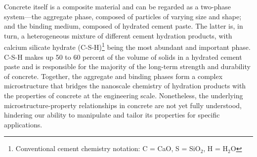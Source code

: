 Concrete itself is a composite material and can be regarded as a two-phase system\supercite{mehta2014concrete}---the aggregate phase, composed of particles of varying size and shape; and the binding medium, composed of hydrated cement paste. The latter is, in turn, a heterogeneous mixture of different cement hydration products, with calcium silicate hydrate (C-S-H)\footnote{
Conventional cement chemistry notation: C = CaO, S = SiO$_2$, H = H$_2$O
} being the most abundant and important phase. C-S-H makes up 50 to 60 percent of the volume of solids in a hydrated cement paste and is responsible for the majority of the long-term strength and durability of concrete\supercite{mehta2014concrete}. Together, the aggregate and binding phases form a complex microstructure that bridges the nanoscale chemistry of hydration products with the properties of concrete at the engineering scale. Nonetheless, the underlying microstructure-property relationships in concrete are not yet fully understood, hindering our ability to manipulate and tailor its properties for specific applications. 


